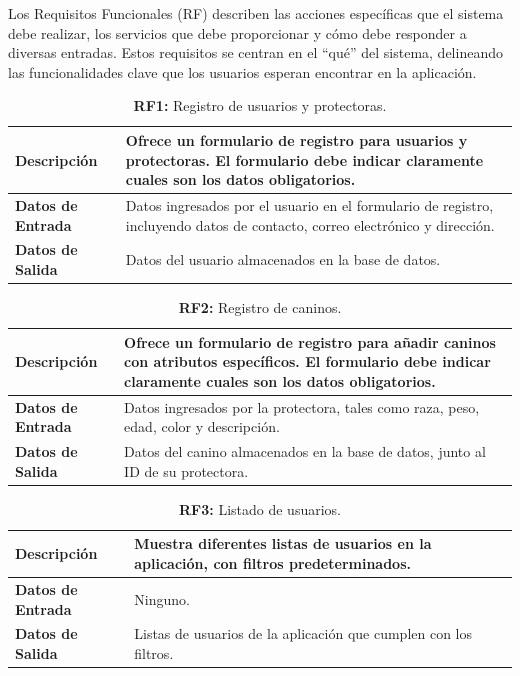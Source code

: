 \documentclass[a4paper, 12pt]{article}
\begin{document}
Los Requisitos Funcionales (RF) describen las acciones específicas que el sistema debe realizar, los servicios que debe proporcionar y cómo debe responder a diversas entradas. Estos requisitos se centran en el ``qué'' del sistema, delineando las funcionalidades clave que los usuarios esperan encontrar en la aplicación.

\begin{table}[H]
\captionsetup{list=no}%
\captionsetup{justification=raggedright,singlelinecheck=false}
\captionsetup{labelformat=empty}
\caption{\textbf{RF1:} Registro de usuarios y protectoras.}
\label{tab:RF1}
	\begin{tabular}{|m{5cm}|m{10cm}|}
	\hline
	\textbf{Descripción} & Ofrece un formulario de registro para usuarios y protectoras. El formulario debe indicar claramente cuales son los datos obligatorios. \\ 
	\hline
	\textbf{Datos de Entrada} & Datos ingresados por el usuario en el formulario de registro, incluyendo datos de contacto, correo electrónico y dirección. \\ 
	\hline
	\textbf{Datos de Salida} & Datos del usuario almacenados en la base de datos. \\ 
	\hline
\end{tabular}
\end{table}

\begin{table}[H]
\captionsetup{list=no}%
\captionsetup{justification=raggedright,singlelinecheck=false}
\captionsetup{labelformat=empty}
\caption{\textbf{RF2:} Registro de caninos.}
\label{tab:RF2}
	\begin{tabular}{|m{5cm}|m{10cm}|}
	\hline
	\textbf{Descripción} & Ofrece un formulario de registro para añadir caninos con atributos específicos. El formulario debe indicar claramente cuales son los datos obligatorios. \\ 
	\hline
	\textbf{Datos de Entrada} & Datos ingresados por la protectora, tales como raza, peso, edad, color y descripción. \\ 
	\hline
	\textbf{Datos de Salida} & Datos del canino almacenados en la base de datos, junto al ID de su protectora. \\ 
	\hline
\end{tabular}
\end{table}

\begin{table}[H]
\captionsetup{list=no}%
\captionsetup{justification=raggedright,singlelinecheck=false}
\captionsetup{labelformat=empty}
\caption{\textbf{RF3:} Listado de usuarios.}
\label{tab:RF23}
	\begin{tabular}{|m{5cm}|m{10cm}|}
	\hline
	\textbf{Descripción} & Muestra diferentes listas de usuarios en la aplicación, con filtros predeterminados. \\ 
	\hline
	\textbf{Datos de Entrada} & Ninguno. \\ 
	\hline
	\textbf{Datos de Salida} & Listas de usuarios de la aplicación que cumplen con los filtros.  \\ 
	\hline
\end{tabular}
\end{table}
\end{document}
